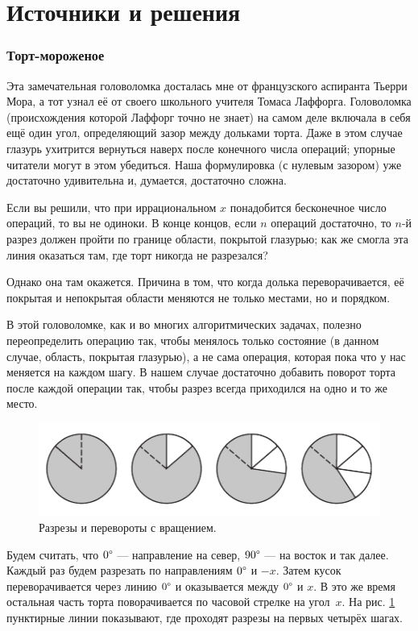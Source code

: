 \section*{Источники и решения}

\subsubsection*{Торт-мороженое}

Эта замечательная головоломка досталась мне от французского аспиранта Тьерри Мора,
а тот узнал её от своего школьного учителя Томаса Лаффорга.
Головоломка (происхождения которой Лаффорг точно не знает) на самом деле включала в себя ещё один угол, определяющий зазор между дольками торта.
Даже в этом случае глазурь ухитрится вернуться наверх после конечного числа операций;
упорные читатели могут в этом убедиться.
Наша формулировка (с нулевым зазором) уже достаточно удивительна и, думается, достаточно сложна.

Если вы решили, что при иррациональном $x$ понадобится бесконечное число операций, то вы не одиноки.
В конце концов, если $n$ операций достаточно, то $n$-й разрез должен пройти по границе области, покрытой глазурью;
как же смогла эта линия оказаться там, где торт никогда не разрезался?

Однако она там окажется.
Причина в том, что когда долька переворачивается, её покрытая и непокрытая области  меняются не только местами, но и порядком.

В этой головоломке, как и во многих алгоритмических задачах, полезно переопределить операцию так, чтобы менялось только состояние (в данном случае, область, покрытая глазурью), а не сама операция, которая пока что у нас меняется на каждом шагу.
В нашем случае достаточно добавить поворот торта после каждой операции так, чтобы разрез всегда приходился на одно и то же место.


\begin{figure}[htb!]
\centering
\includegraphics[scale=.9]{pics/tort2}
\caption{Разрезы и перевороты с вращением.}
\label{pic:tort2}
\end{figure}

Будем считать, что $0\degree$ --- направление на север,
$90\degree$ --- на восток и так далее.
Каждый раз будем разрезать по направлениям $0\degree$ и $-x$.
Затем кусок переворачивается через линию $0\degree$ и оказывается между $0\degree$ и $x$.
В это же время остальная часть торта поворачивается по часовой стрелке на угол~$x$.
На рис. \ref{pic:tort2} пунктирные линии показывают, где проходят разрезы на первых четырёх шагах.

